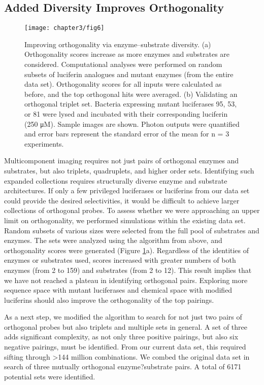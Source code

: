 \subsection*{Added Diversity Improves Orthogonality}
\begin{figure}[htb]
\texttt{[image: chapter3/fig6]}
\centering
\caption[Improving orthogonality via enzyme–substrate diversity]{Improving orthogonality via enzyme–substrate diversity. (a) Orthogonality scores increase as more enzymes and substrates are considered. Computational analyses were performed on random subsets of luciferin analogues and mutant enzymes (from the entire data set). Orthogonality scores for all inputs were calculated as before, and the top orthogonal hits were averaged. (b) Validating an orthogonal triplet set. Bacteria expressing mutant luciferases 95, 53, or 81 were lysed and incubated with their corresponding luciferin (250 μM). Sample images are shown. Photon outputs were quantified and error bars represent the standard error of the mean for n = 3 experiments.}
  \label{fig:surface}
\end{figure}
Multicomponent imaging requires not just pairs of orthogonal enzymes and substrates, but also triplets, quadruplets, and higher order sets. Identifying such expanded collections requires structurally diverse enzyme and substrate architectures. If only a few privileged luciferases or luciferins from our data set could provide the desired selectivities, it would be difficult to achieve larger collections of orthogonal probes. To assess whether we were approaching an upper limit on orthogonality, we performed simulations within the existing data set. Random subsets of various sizes were selected from the full pool of substrates and enzymes. The sets were analyzed using the algorithm from above, and orthogonality scores were generated (Figure \ref{fig:surface}a). Regardless of the identities of enzymes or substrates used, scores increased with greater numbers of both enzymes (from 2 to 159) and substrates (from 2 to 12). This result implies that we have not reached a plateau in identifying orthogonal pairs. Exploring more sequence space with mutant luciferases and chemical space with modified luciferins should also improve the orthogonality of the top pairings.
\par
As a next step, we modified the algorithm to search for not just two pairs of orthogonal probes but also triplets and multiple sets in general. A set of three adds significant complexity, as not only three positive pairings, but also six negative pairings, must be identified. From our current data set, this required sifting through >144 million combinations. We combed the original data set in search of three mutually orthogonal enzyme?substrate pairs. A total of 6171 potential sets were identified.

